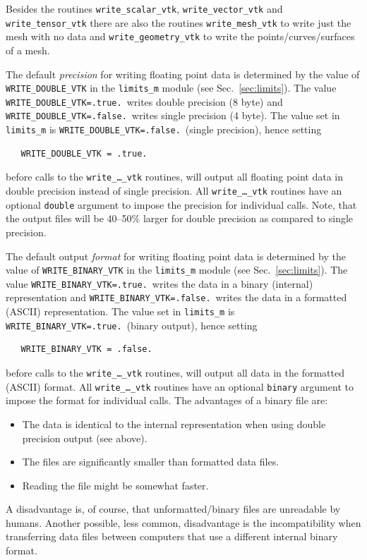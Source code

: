 Besides the routines \texttt{write\_scalar\_vtk},
\texttt{write\_vector\_vtk} and
\texttt{write\_tensor\_vtk} there are also the routines
\texttt{write\_mesh\_vtk} to write just the mesh with no data and \texttt{write\_geometry\_vtk}
to write the points/curves/surfaces of a mesh.

The default \emph{precision} for writing floating point data is determined by the value of \texttt{WRITE\_DOUBLE\_VTK} in the \texttt{limits\_m} module (see Sec.~\ref{sec:limits}). The value \texttt{WRITE\_DOUBLE\_VTK=.true.}\
  writes double precision (8 byte) and
 \texttt{WRITE\_DOUBLE\_VTK=.false.}\ writes single precision (4 byte).
 The value set in \texttt{limits\_m} is \texttt{WRITE\_DOUBLE\_VTK=.false.}\ (single precision), hence setting
\begin{verbatim}
   WRITE_DOUBLE_VTK = .true.
\end{verbatim}
before calls to the \texttt{write\_\ldots\_vtk} routines, will output all floating point data in double precision instead of single precision.
All \texttt{write\_\ldots\_vtk} routines have an optional \texttt{double} argument to impose the precision for individual calls. Note, that the output files will be 40--50\% larger for double precision as compared to single precision.

The default output \emph{format} for writing floating point data is determined by the value of \texttt{WRITE\_BINARY\_VTK} in the \texttt{limits\_m} module (see Sec.~\ref{sec:limits}). The value \texttt{WRITE\_BINARY\_VTK=.true.}\
  writes the data in a binary (internal) representation and
 \texttt{WRITE\_BINARY\_VTK=.false.}\ writes the data in a formatted (ASCII) representation.
The value set in \texttt{limits\_m} is \texttt{WRITE\_BINARY\_VTK=.true.}\ (binary output), hence setting
\begin{verbatim}
   WRITE_BINARY_VTK = .false.
\end{verbatim}
before calls to the \texttt{write\_\ldots\_vtk} routines, will output all data in the formatted (ASCII) format.
All \texttt{write\_\ldots\_vtk} routines have an optional \texttt{binary} argument to impose the format for individual calls. 
The advantages of a binary file are:
\begin{itemize}
 \item The data is identical to the internal representation when using double precision output (see above).
 \item The files are significantly smaller than formatted data files.
 \item Reading the file might be somewhat faster.
\end{itemize}
A disadvantage is, of course, that unformatted/binary files are unreadable by humans. Another possible, less common, disadvantage is the
incompatibility when transferring data files between computers that use a different internal binary format.

